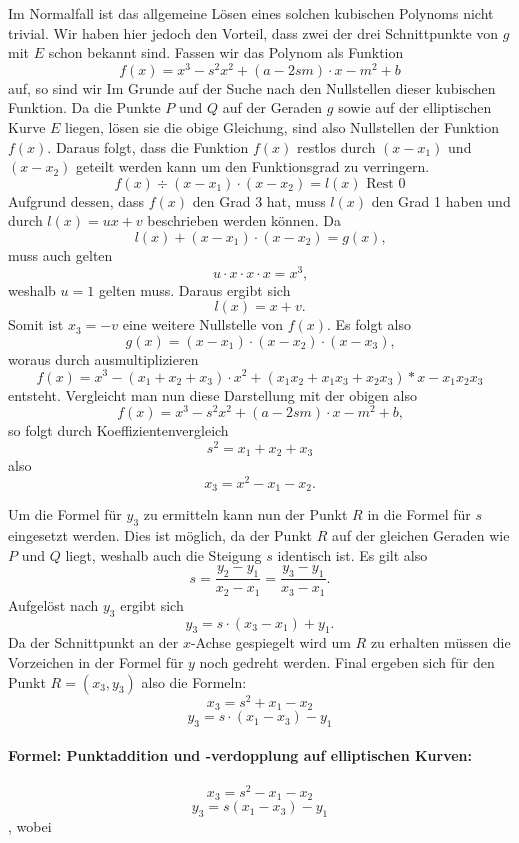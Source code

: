 Im Normalfall ist das allgemeine Lösen eines solchen kubischen Polynoms nicht trivial. Wir haben hier jedoch den Vorteil, dass zwei der drei Schnittpunkte von $g$ mit $E$ schon bekannt sind. Fassen wir das Polynom als Funktion $$f(x) = x^3 - s^2x^2 + (a-2sm)\cdot x - m^2+b$$ auf, so sind wir Im Grunde auf der Suche nach den Nullstellen dieser kubischen Funktion. Da die Punkte $P$ und $Q$ auf der Geraden $g$ sowie auf der elliptischen Kurve $E$ liegen, lösen sie die obige
Gleichung, sind also Nullstellen der Funktion $f(x)$. Daraus folgt, dass die Funktion $f(x)$ restlos durch $(x-x_1)$ und $(x-x_2)$ geteilt werden kann um den Funktionsgrad zu verringern.
$$f(x) \div (x-x_1) \cdot (x-x_2) = l(x) \text{  Rest }0$$
Aufgrund dessen, dass $f(x)$ den Grad 3 hat, muss $l(x)$ den Grad 1 haben und durch $l(x) = ux + v$ beschrieben werden können. Da $$l(x) + (x-x_1) \cdot (x-x_2) = g(x)\text{,}$$ muss auch gelten $$u \cdot x \cdot x \cdot x  = x^3\text{,}$$ weshalb $u = 1$ gelten muss. Daraus ergibt sich $$l(x) = x + v \text{.}$$ Somit ist $x_3 = -v$ eine weitere Nullstelle von $f(x)$. Es folgt also $$g(x) = (x-x_1) \cdot (x-x_2) \cdot (x-x_3) \text{,}$$ woraus durch ausmultiplizieren $$f(x) = x^3 - (x_1 + x_2 + x_3) \cdot x^2 + (x_1 x_2 + x_1 x_3 + x_2 x_3) * x - x_1 x_2 x_3$$ entsteht. Vergleicht man nun diese Darstellung mit der obigen also $$f(x) = x^3 - s^2x^2 + (a-2sm)\cdot x - m^2+b\text{,}$$ so folgt durch Koeffizientenvergleich $$s^2 = x_1 + x_2 +x_3$$ also $$x_3 = x^2 -x_1 - x_2.$$

Um die Formel für $y_3$ zu ermitteln kann nun der Punkt $R$ in die Formel für $s$ eingesetzt werden. Dies ist möglich, da der Punkt $R$ auf der gleichen Geraden wie $P$ und $Q$ liegt, weshalb auch die Steigung $s$ identisch ist.
Es gilt also $$s = \frac{y_2 - y_1}{x_2  - x_1} = \frac{y_3 - y_1}{x_3  - x_1}.$$ 
Aufgelöst nach $y_3$ ergibt sich $$y_3 = s \cdot (x_3 - x_1) + y_1 \text{.}$$
Da der Schnittpunkt an der $x$-Achse gespiegelt wird um $R$ zu erhalten müssen die Vorzeichen in der Formel für $y$ noch gedreht werden. Final ergeben sich für den Punkt $R = (x_3, y_3)$ also die Formeln:
$$x_3 = s^2 + x_1 - x_2$$
$$y_3 = s \cdot (x_1 - x_3) - y_1$$


\paragraph{Formel: Punktaddition und -verdopplung auf elliptischen Kurven\cite[278]{Paar.2016}:}
$$x_3 = s^2 - x_1 - x_2$$
$$y_3 = s(x_1 - x_3) - y_1$$,
wobei

